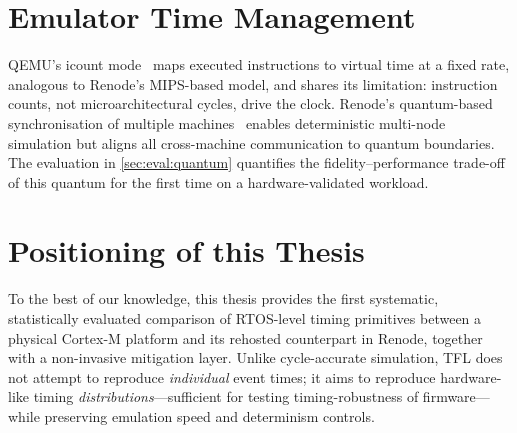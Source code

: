 \section{Emulator Time Management}
\label{sec:rw:quantum}

QEMU's icount mode~\cite{bellard2005qemu} maps executed instructions to
virtual time at a fixed rate, analogous to Renode's MIPS-based model,
and shares its limitation: instruction counts, not microarchitectural
cycles, drive the clock. Renode's quantum-based synchronisation of
multiple machines~\cite{renode} enables deterministic multi-node
simulation but aligns all cross-machine communication to quantum
boundaries. The evaluation in \cref{sec:eval:quantum} quantifies the
fidelity--performance trade-off of this quantum for the first time on
a hardware-validated workload.

\section{Positioning of this Thesis}
\label{sec:rw:positioning}

To the best of our knowledge, this thesis provides the first
systematic, statistically evaluated comparison of RTOS-level timing
primitives between a physical Cortex-M platform and its rehosted
counterpart in Renode, together with a non-invasive mitigation layer.
Unlike cycle-accurate simulation, TFL does not attempt to reproduce
\emph{individual} event times; it aims to reproduce hardware-like
timing \emph{distributions}---sufficient for testing timing-robustness
of firmware---while preserving emulation speed and determinism controls.
